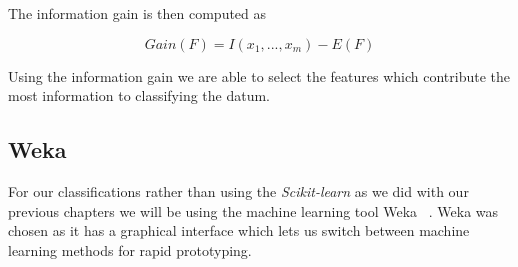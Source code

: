 The information gain is then computed as 

\begin{equation}\label{Gain}
	Gain(F)=I(x_1,...,x_m)-E(F)
\end{equation}

Using the information gain we are able to select the features which contribute the most information to classifying the datum. 

\subsection{Weka}
For our classifications rather than using the \textit{Scikit-learn} as we did with our previous chapters we will be using the machine learning tool Weka ~\cite{hall2009weka}. Weka was chosen as it has a graphical interface which lets us switch between machine learning methods for rapid prototyping. 